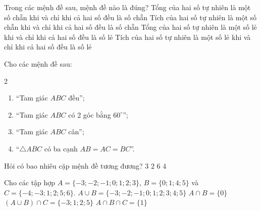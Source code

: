 \begin{ex}%
	Trong các  mệnh đề sau, mệnh đề nào là đúng?
	 \choice
		 {Tổng của hai số tự nhiên là một số chẵn khi và chỉ khi cả hai số đều là số chẵn}
		 {Tích của hai số tự nhiên là một số chẵn khi và chỉ khi cả hai số đều là số chẵn}
		{Tổng của hai số tự nhiên là một số  lẻ khi và chỉ khi cả hai số đều là số lẻ}
		{\True Tích của hai số tự nhiên là một số  lẻ khi và chỉ khi cả hai số đều là số lẻ}
\end{ex}

\begin{ex}%
	Cho các  mệnh đề sau:
	\begin{multicols}{2}
		\begin{enumerate}
			 \item ``Tam giác $ABC$ đều'';
			\item ``Tam giác $ABC$  có 2 góc bằng $60^\circ$'';
			\item ``Tam giác $ABC$  cân'';
			 \item ``$\triangle ABC$ có ba cạnh $AB=AC=BC$''.
		\end{enumerate}
	\end{multicols}
	Hỏi có bao nhiêu cặp mệnh đề  tương đương?
	\choice 
		{\True $3$} 
		{$2$} 
		{$6$} 
		 {$4$}
\end{ex}

\begin{ex}%
	Cho các tập hợp $A=\{-3;-2;-1; 0; 1; 2;  3\}$, $B=\{0; 1; 4; 5\}$ và $C=\{-4;-3; 1; 2; 5; 6\}$.
	 \choiceTF
		 {\True $A\cup B=\{-3;-2;-1; 0; 1; 2; 3; 4; 5\}$}
		{$A\cap  B=\{0\}$}
		{\True  $(A\cup B)\cap C=\{-3; 1; 2; 5\}$}
		{\True $A\cap B\cap  C=\{1\}$}
\end{ex}

